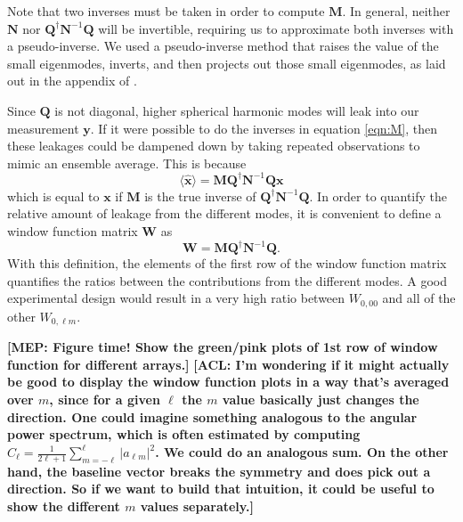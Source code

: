 \documentclass[twolcolumn,apj]{emulateapj}
\newcommand{\x}{\mathbf{x}}
\newcommand{\xhat}{\hat{\mathbf{x}}}
\newcommand{\y}{\mathbf{y}}
\newcommand{\N}{\mathbf{N}}
\newcommand{\Q}{\mathbf{Q}}
\newcommand{\M}{\mathbf{M}}
\newcommand{\W}{\mathbf{W}}
\newcommand{\acl}[1]{{\color{red} \textbf{[ACL:  #1]}}}
\newcommand{\mep}[1]{{\color{applegreen} \textbf{[MEP:  #1]}}}
\begin{document}
Note that two inverses must be taken in order to compute $\M$. In general, neither $\N$ nor $\Q^\dagger \N^{-1} \Q$ will be invertible, requiring us to approximate both inverses with a pseudo-inverse. We used a pseudo-inverse method that raises the value of the small eigenmodes, inverts, and then projects out those small eigenmodes, as laid out in the appendix of \citet{Tegmark_CMB_spectra_wli}. 

Since $\Q$ is not diagonal, higher spherical harmonic modes will leak into our measurement $\y$. If it were possible to do the inverses in equation \ref{eqn:M}, then these leakages could be dampened down by taking repeated observations to mimic an ensemble average. This is because 
\begin{equation}
\langle \xhat \rangle = \M \Q^\dagger \N^{-1} \Q \x
\end{equation}
which is equal to $\x$ if $\M$ is the true inverse of $\Q^\dagger \N^{-1} \Q$. In order to quantify the relative amount of leakage from the different modes, it is convenient to define a window function matrix $\W$ as 
\begin{equation}
\W = \M \Q^\dagger \N^{-1} \Q. 
\end{equation}
With this definition, the elements of the first row of the window function matrix quantifies the ratios between the contributions from the different modes. A good experimental design would result in a very high ratio between $W_{0,00}$ and all of the other $W_{0,\ell m}$.

\mep{Figure time! Show the green/pink plots of 1st row of window function for different arrays.}
\acl{I'm wondering if it might actually be good to display the window function plots in a way that's averaged over $m$, since for a given $\ell$ the $m$ value basically just changes the direction.  One could imagine something analogous to the angular power spectrum, which is often estimated by computing $\hat{C}_\ell = \frac{1}{2\ell + 1} \sum_{m=-\ell}^{\ell} |a_{\ell m}|^2$.  We could do an analogous sum.  On the other hand, the baseline vector breaks the symmetry and does pick out a direction.  So if we want to build that intuition, it could be useful to show the different $m$ values separately.}
\end{document}
